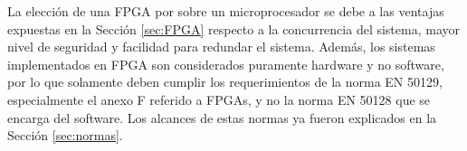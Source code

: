	La elección de una FPGA por sobre un microprocesador se debe a las ventajas expuestas en la Sección \ref{sec:FPGA} respecto a la concurrencia del sistema, mayor nivel de seguridad y facilidad para redundar el sistema. Además, los sistemas implementados en FPGA son considerados puramente hardware y no software, por lo que solamente deben cumplir los requerimientos de la norma EN 50129, especialmente el anexo F referido a FPGAs, y no la norma EN 50128 que se encarga del software. Los alcances de estas normas ya fueron explicados en la Sección \ref{sec:normas}.